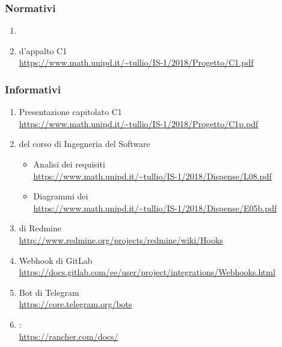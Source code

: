 	\subsubsection{Normativi}
	\begin{enumerate}
		\item \Doc{\NdPv}
		\item {} d'appalto C1\\
		\url{https://www.math.unipd.it/~tullio/IS-1/2018/Progetto/C1.pdf}
	\end{enumerate}

	\subsubsection{Informativi} \label{sec:RiferimentiInformativi}
	\begin{enumerate}
		\item Presentazione capitolato C1\\
		\url{https://www.math.unipd.it/~tullio/IS-1/2018/Progetto/C1p.pdf}
		\item {} del corso di Ingegneria del Software
		\begin{itemize}
			\item Analisi dei requisiti\\
			\url{https://www.math.unipd.it/~tullio/IS-1/2018/Dispense/L08.pdf}
			\item Diagrammi dei \\
			\url{https://www.math.unipd.it/~tullio/IS-1/2018/Dispense/E05b.pdf}
		\end{itemize}
		\item {} di Redmine\\
		\url{http://www.redmine.org/projects/redmine/wiki/Hooks}
		\item Webhook di GitLab\\
		\url{https://docs.gitlab.com/ee/user/project/integrations/Webhooks.html}
		\item Bot di Telegram\\
		\url{https://core.telegram.org/bots}
		\item {}: \\\url{https://rancher.com/docs/}
	\end{enumerate}